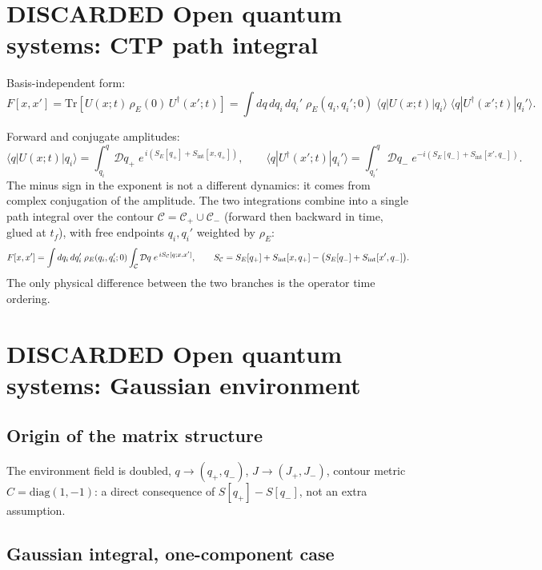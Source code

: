 \documentclass[12pt,a4paper,oneside]{article}
\numberwithin{equation}{section}   %
\begin{document}
\newpage

\section{DISCARDED Open quantum systems: CTP path integral}

Basis-independent form:
\begin{equation}
F[x,x']
=
\mathrm{Tr}
\!\left[
U(x;t)\,\rho_E(0)\,U^\dagger(x';t)
\right]
=
\int dq\,dq_i\,dq_i'\;
\rho_E(q_i,q_i';0)\;
\langle q|U(x;t)|q_i\rangle\;
\langle q|U^\dagger(x';t)|q_i'\rangle.
\end{equation}

Forward and conjugate amplitudes:
\[
\langle q|U(x;t)|q_i\rangle
=
\int_{q_i}^{q}\mathcal{D}q_+\;
e^{\,i\left(S_E[q_+] + S_{\mathrm{int}}[x,q_+]\right)},
\qquad
\langle q|U^\dagger(x';t)|q_i'\rangle
=
\int_{q_i'}^{q}\mathcal{D}q_-\;
e^{-i\left(S_E[q_-] + S_{\mathrm{int}}[x',q_-]\right)}.
\]
The minus sign in the exponent is not a different dynamics: it comes from complex conjugation of the amplitude. The two integrations combine into a single path integral over the contour $\mathcal C=\mathcal C_+\cup\mathcal C_-$ (forward then backward in time, glued at $t_f$), with free endpoints $q_i,q_i'$ weighted by $\rho_E$:
\begin{equation}
F[x,x']
=
\int dq_i\,dq_i'\;
\rho_E(q_i,q_i';0)
\int_{\mathcal{C}}\mathcal{D}q\;
e^{\,iS_{\mathcal{C}}[q;x,x']},
\qquad
S_{\mathcal{C}} = S_E[q_+]+S_{\rm int}[x,q_+] - \big(S_E[q_-]+S_{\rm int}[x',q_-]\big).
\end{equation}
The only physical difference between the two branches is the operator time ordering.

\section{DISCARDED Open quantum systems: Gaussian environment}

\subsection*{Origin of the matrix structure}

The environment field is doubled, $q\to(q_+,q_-)$, $J\to(J_+,J_-)$, contour metric $C=\mathrm{diag}(1,-1)$: a direct consequence of $S[q_+]-S[q_-]$, not an extra assumption.

\subsection*{Gaussian integral, one-component case}
\end{document}
